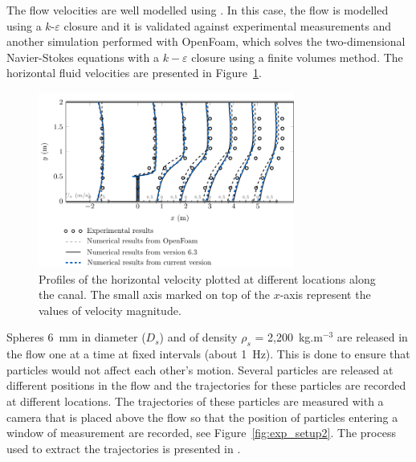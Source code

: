 The flow velocities are well modelled using .
In this case, the flow is modelled using a $k$-$\varepsilon$ closure and it is
validated against experimental measurements and another simulation performed
with OpenFoam, which solves the two-dimensional Navier-Stokes equations with a
$k-\varepsilon$ closure using a finite volumes method.
The horizontal fluid velocities are presented in
Figure~\ref{fig:profil_vitesses_canal}.

\begin{figure}[H]
\begin{center}
  \includegraphics[width=0.75\textwidth]{./img/CanalAlgFluidVelocities}
\end{center}
\caption{Profiles of the horizontal velocity plotted at different locations along the canal. The small axis marked on
top of the $x$-axis represent the values of velocity magnitude.}
\label{fig:profil_vitesses_canal}
\end{figure}

Spheres 6~mm in diameter ($D_s$) and of density $\rho_s$ = 2,200~kg.m$^{-3}$
are released in the flow one at a time at fixed intervals (about 1~Hz).
This is done to ensure that particles would not affect each other's motion.
Several particles are released at different positions in the flow and the
trajectories for these particles are recorded at different locations.
The trajectories of these particles are measured with a camera that is placed
above the flow so that the position of particles entering a window of measurement
are recorded, see Figure~\ref{fig:exp_setup2}.
The process used to extract the trajectories is presented in \citet{Joly2011}.

